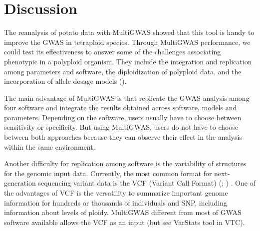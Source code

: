 \documentclass{article}
\begin{document}


\section{Discussion}

The reanalysis of potato data with MultiGWAS showed that this tool is handy to improve the GWAS in tetraploid species. Through MultiGWAS performance, we could test its effectiveness to answer some of the challenges associating phenotypic in a polyploid organism. They include the integration and replication among parameters and software, the diploidization of polyploid data, and the incorporation of allele dosage models (\cite{dufresne2014}). 


The main advantage of MultiGWAS is that replicate the GWAS analysis among four software and integrate the results obtained across software, models and parameters. Depending on the software, users usually have to choose between sensitivity or specificity. But using MultiGWAS, users do not have to choose between both approaches because they can observe their effect in the analysis within the same environment.  

Another difficulty for replication among software is the variability of structures for the genomic input data. Currently, the most common format for next-generation sequencing variant data is the VCF (Variant Call Format) (\cite{Danecek2011}; \cite{Ebbert2014}) . One of the advantages of VCF is the versatility to summarize important genome information for hundreds or thousands of individuals and SNP, including information about levels of ploidy. MultiGWAS different from most of GWAS software available allows the VCF as an input (but see VarStats tool in VTC).  
\end{document}
